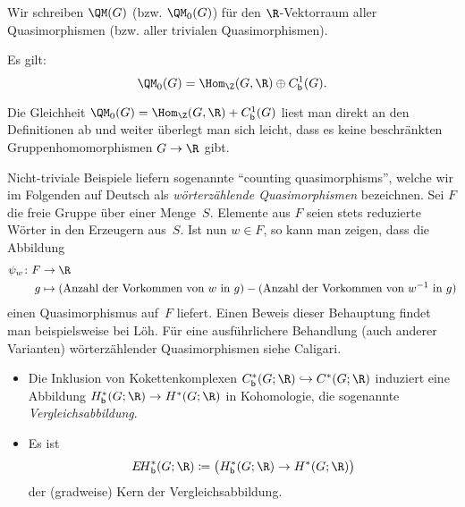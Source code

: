 \begin{thDef}
    Wir schreiben $\QM(G)$ (bzw. $\QM_0(G)$) für den $\R$-Vektorraum aller
    Quasimorphismen (bzw. aller trivialen Quasimorphismen). 
\end{thDef}

\begin{thProposition}
    \label{qmor:decompQM0}%
    Es gilt:
    \[ \QM_0(G) = \Hom_\Z(G,\R) \oplus \Cb^1(G)  . \]
\end{thProposition}

\begin{proofsketch}
    Die Gleichheit $\QM_0(G) = \Hom_\Z(G,\R) + \Cb^1(G)$ liest man direkt an den
    Definitionen ab und weiter überlegt man sich leicht, dass es keine beschränkten
    Gruppenhomomorphismen $G\to\R$ gibt.
    \\
\end{proofsketch}

\begin{thBeispiel}
    Nicht-triviale Beispiele liefern sogenannte \enquote{counting
    quasimorphisms}, welche wir im Folgenden auf Deutsch als
    \emph{wörterzählende Quasimorphismen} bezeichnen. Sei $F$ die freie Gruppe
    über einer Menge~$S$. Elemente aus $F$ seien stets reduzierte Wörter in den
    Erzeugern aus~$S$. Ist nun $w\in F$, so kann man zeigen, dass die Abbildung
    \begin{align*}
        \psi_w\colon F &\to \R  \\
        g &\mapsto (\text{Anzahl der Vorkommen von $w$ in $g$})
                 - (\text{Anzahl der Vorkommen von $w^{-1}$ in $g$})
    \end{align*}
    einen Quasimorphismus auf~$F$ liefert. Einen Beweis dieser Behauptung findet
    man beispielsweise bei
    Löh\cite[Ch.\,2,.3,\;Lemma~2.5.11]{lecnotes:loeh:bdcoho}.
    Für eine ausführlichere Behandlung (auch anderer Varianten) wörterzählender
    Quasimorphismen siehe Caligari\cite[Ch.\,2,.2]{bookc:calegari09}.
\end{thBeispiel}

\begin{thErinnerDef} \hfill
    \begin{itemize}
        \item
            Die Inklusion von Kokettenkomplexen $\Cb^\ast(G;\R) \hookrightarrow
            C^\ast(G;\R)$ induziert eine Abbildung $\Hb^\ast(G;\R) \to
            H^\ast(G;\R)$ in Kohomologie, die sogenannte
            \emph{Vergleichsabbildung}.
        \item
            Es ist
            \[ \EHb^\ast(G;\R)
                \defeq \ker\bigl( \Hb^\ast(G;\R) \to H^\ast(G;\R) \bigr)
            \]
            der (gradweise) Kern der Vergleichsabbildung.
    \end{itemize}
\end{thErinnerDef}


